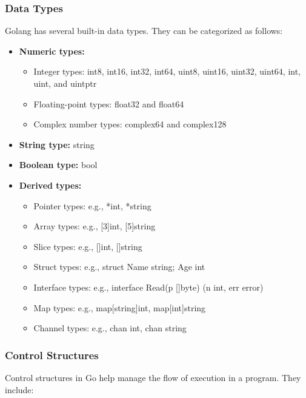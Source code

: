 \documentclass{article}
\begin{document}
\subsubsection{Data Types}

Golang has several built-in data types. They can be categorized as follows:

\begin{itemize}
\item \textbf{Numeric types:}
\begin{itemize}
\item Integer types: int8, int16, int32, int64, uint8, uint16, uint32, uint64, int, uint, and uintptr
\item Floating-point types: float32 and float64
\item Complex number types: complex64 and complex128
\end{itemize}
\item \textbf{String type:} string
\item \textbf{Boolean type:} bool
\item \textbf{Derived types:}
\begin{itemize}
\item Pointer types: e.g., *int, *string
\item Array types: e.g., [3]int, [5]string
\item Slice types: e.g., []int, []string
\item Struct types: e.g., struct {Name string; Age int}
\item Interface types: e.g., interface {Read(p []byte) (n int, err error)}
\item Map types: e.g., map[string]int, map[int]string
\item Channel types: e.g., chan int, chan string
\end{itemize}
\end{itemize}

\subsubsection{Control Structures}

Control structures in Go help manage the flow of execution in a program. They include:
\end{document}
